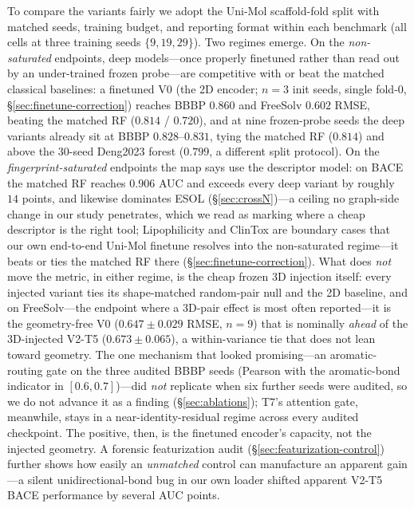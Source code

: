 \documentclass[sigconf,nonacm,anonymous,review]{acmart}
\begin{document}
To compare the variants fairly we adopt the Uni-Mol scaffold-fold split with matched seeds, training budget, and reporting format within each benchmark (all cells at three training seeds $\{9, 19, 29\}$). Two regimes emerge. On the \emph{non-saturated} endpoints, deep models---once properly finetuned rather than read out by an under-trained frozen probe---are competitive with or beat the matched classical baselines: a finetuned V0 (the 2D encoder; $n{=}3$ init seeds, single fold-0, \S\ref{sec:finetune-correction}) reaches BBBP $0.860$ and FreeSolv $0.602$ RMSE, beating the matched RF ($0.814$ / $0.720$), and at nine frozen-probe seeds the deep variants already sit at BBBP $0.828$--$0.831$, tying the matched RF ($0.814$) and above the $30$-seed Deng2023 forest ($0.799$, a different split protocol). On the \emph{fingerprint-saturated} endpoints the map says use the descriptor model: on BACE the matched RF reaches $0.906$ AUC and exceeds every deep variant by roughly $14$ points, and likewise dominates ESOL (\S\ref{sec:crossN})---a ceiling no graph-side change in our study penetrates, which we read as marking where a cheap descriptor is the right tool; Lipophilicity and ClinTox are boundary cases that our own end-to-end Uni-Mol finetune resolves into the non-saturated regime---it beats or ties the matched RF there (\S\ref{sec:finetune-correction}). What does \emph{not} move the metric, in either regime, is the cheap frozen 3D injection itself: every injected variant ties its shape-matched random-pair null and the 2D baseline, and on FreeSolv---the endpoint where a 3D-pair effect is most often reported---it is the geometry-free V0 ($0.647 \pm 0.029$ RMSE, $n{=}9$) that is nominally \emph{ahead} of the 3D-injected V2-T5 ($0.673 \pm 0.065$), a within-variance tie that does not lean toward geometry. The one mechanism that looked promising---an aromatic-routing gate on the three audited BBBP seeds (Pearson with the aromatic-bond indicator in $[0.6,0.7]$)---did \emph{not} replicate when six further seeds were audited, so we do not advance it as a finding (\S\ref{sec:ablations}); T7's attention gate, meanwhile, stays in a near-identity-residual regime across every audited checkpoint. The positive, then, is the finetuned encoder's capacity, not the injected geometry. A forensic featurization audit (\S\ref{sec:featurization-control}) further shows how easily an \emph{unmatched} control can manufacture an apparent gain---a silent unidirectional-bond bug in our own loader shifted apparent V2-T5 BACE performance by several AUC points.
\end{document}
